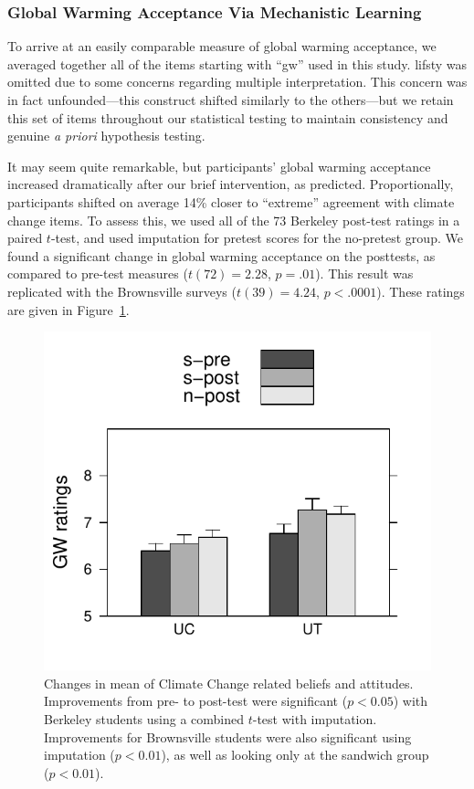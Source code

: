 \subsubsection{Global Warming Acceptance Via Mechanistic Learning}

To arrive at an easily comparable measure of global warming acceptance, we
averaged together all of the items starting with “gw” used in this study.
\textsf{lifsty} was omitted due to some concerns regarding multiple
interpretation. This concern was in fact unfounded---this construct shifted
similarly to the others---but we retain this set of items throughout our
statistical testing to maintain consistency and genuine \emph{a priori}
hypothesis testing. 

It may seem quite remarkable, but participants’ global warming acceptance
increased dramatically after our brief intervention, as predicted.
Proportionally, participants shifted on average 14\% closer to ``extreme''
agreement with climate change items. To assess this, we used all of the 73
Berkeley post-test ratings in a paired $t$-test, and used imputation for pretest
scores for the no-pretest group. We found a significant change in global warming
acceptance on the posttests, as compared to pre-test measures ($t(72) = 2.28$,
$p = .01$). This result was replicated with the Brownsville surveys ($t(39) =
4.24$, $p < .0001$). These ratings are given in
Figure~\ref{fig:class-gw-ratings}.

\begin{figure}
    \centering
    \includegraphics{class-gw-ratings.pdf}
    \caption{Changes in mean of Climate Change related beliefs and attitudes.
        Improvements from pre- to post-test were significant ($p < 0.05$) with
        Berkeley students using a combined $t$-test with imputation.
        Improvements for Brownsville students were also significant using
        imputation ($p < 0.01$), as well as looking only at the sandwich group
        ($p < 0.01$).}
    \label{fig:class-gw-ratings}
\end{figure}

